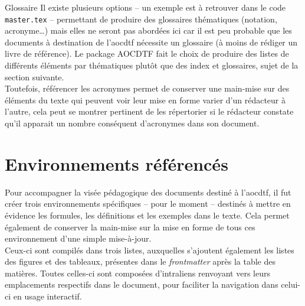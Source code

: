 \documentclass[a4paper, 11pt, twoside, fleqn]{memoir}
\begin{document}
\begin{exemple}{Glossaire}{}
Il existe plusieurs options -- un exemple est à retrouver dans le code \texttt{master.tex} -- permettant de produire des glossaires thématiques (notation, acronyme\ldots) mais elles ne seront pas abordées ici car il est peu probable que les documents à destination de l'\gls{aocdtf} nécessite un glossaire (à moins de rédiger un livre de référence). Le package AOCDTF fait le choix de produire des listes de différents éléments par thématiques plutôt que des index et glossaires, sujet de la section suivante.\\
Toutefois, référencer les acronymes permet de conserver une main-mise sur des éléments du texte qui peuvent voir leur mise en forme varier d'un rédacteur à l'autre, cela peut se montrer pertinent de les répertorier si le rédacteur constate qu'il apparait un nombre conséquent d'acronymes dans son document.

\end{exemple}

	\section{Environnements référencés\label{sec:environnements_references}}
	
Pour accompagner la visée pédagogique des documents destiné à l'\gls{aocdtf}, il fut créer trois environnements spécifiques -- pour le moment -- destinés à mettre en évidence les formules, les définitions et les exemples dans le texte. Cela permet également de conserver la main-mise sur la mise en forme de tous ces environnement d'une simple mise-à-jour.\\
Ceux-ci sont compilés dans trois listes, auxquelles s'ajoutent également les listes des figures et des tableaux, présentes dans le \emph{frontmatter} après la table des matières. Toutes celles-ci sont composées d'intraliens renvoyant vers leurs emplacements respectifs dans le document, pour faciliter la navigation dans celui-ci en usage interactif.
\end{document}
